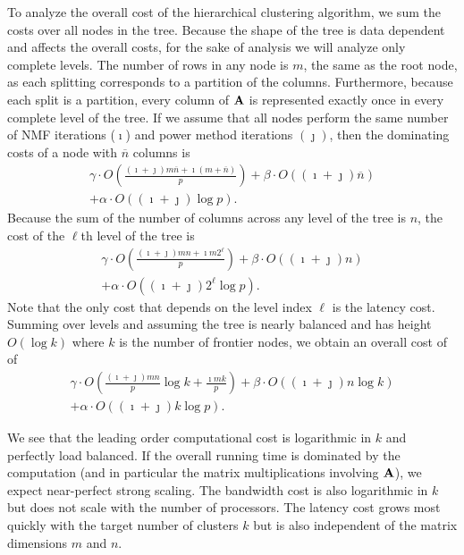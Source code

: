 \documentclass[conference,compsoc]{IEEEtran}
\begin{document}
To analyze the overall cost of the hierarchical clustering algorithm, we sum the costs over all nodes in the tree.
Because the shape of the tree is data dependent and affects the overall costs, for the sake of analysis we will analyze only complete levels.
The number of rows in any node is $m$, the same as the root node, as each splitting corresponds to a partition of the columns.
Furthermore, because each split is a partition, every column of $\M{A}$ is represented exactly once in every complete level of the tree.
If we assume that all nodes perform the same number of NMF iterations ($\imath$) and power method iterations $(\jmath)$, then the dominating costs of a node with $\overline{n}$ columns is
\begin{equation*}
\label{eq:nodecost}
\begin{split}
\gamma \cdot O\left( \frac{(\imath+\jmath) m\overline{n} + \imath (m+\overline{n}) }{p} \right) + \beta \cdot O((\imath+\jmath) \overline{n}) \\ + \alpha \cdot O((\imath+\jmath) \log p).
\end{split}
\end{equation*}
Because the sum of the number of columns across any level of the tree is $n$, the cost of the $\ell$th level of the tree is
\begin{equation}
\label{eq:levelcost}
\begin{split}
\gamma \cdot O\left( \frac{(\imath+\jmath) mn + \imath m 2^\ell}{p} \right) + \beta \cdot O((\imath+\jmath) n) \\ + \alpha \cdot O((\imath+\jmath) 2^\ell \log p).
\end{split}
\end{equation}
Note that the only cost that depends on the level index $\ell$ is the latency cost.
Summing over levels and assuming the tree is nearly balanced and has height $O(\log k)$ where $k$ is the number of frontier nodes, we obtain an overall cost of  of
\begin{equation}
\label{eq:treecost}
\begin{split}
\gamma \cdot O\left( \frac{(\imath+\jmath) mn}{p}  \log k + \frac{\imath mk}{p} \right) + \beta \cdot O((\imath+\jmath) n \log k) \\ + \alpha \cdot O((\imath+\jmath) k \log p).
\end{split}
\end{equation}

We see that the leading order computational cost is logarithmic in $k$ and perfectly load balanced.
If the overall running time is dominated by the computation (and in particular the matrix multiplications involving $\M{A}$), we expect near-perfect strong scaling.
The bandwidth cost is also logarithmic in $k$ but does not scale with the number of processors.
The latency cost grows most quickly with the target number of clusters $k$ but is also independent of the matrix dimensions $m$ and $n$.
\end{document}

